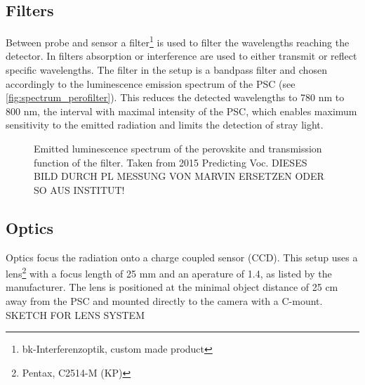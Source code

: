 \subsection{Filters}
Between probe and sensor a filter\footnote{bk-Interferenzoptik, custom made product} is used to filter the wavelengths reaching the detector. In filters absorption or interference are used to either transmit or reflect specific wavelengths. The filter in the setup is a bandpass filter and chosen accordingly to the luminescence emission spectrum of the PSC (see \autoref{fig:spectrum_perofilter}). This reduces the detected wavelengths to 780 nm to 800 nm, the interval with maximal intensity of the PSC, which enables maximum sensitivity to the emitted radiation and limits the detection of stray light. %

\begin{figure}[h]
	\centering
	
	\caption{Emitted luminescence spectrum of the perovskite and transmission function of the filter. Taken from 2015 Predicting Voc. DIESES BILD DURCH PL MESSUNG VON MARVIN ERSETZEN ODER SO AUS INSTITUT!}
	\label{fig:spectrum_perofilter}
\end{figure}
\subsection{Optics}
Optics focus the radiation onto a charge coupled sensor (CCD). This setup uses a lens\footnote{Pentax, C2514-M (KP)} with a focus length of 25 mm and an aperature of 1.4, as listed by the manufacturer. The lens is positioned at the minimal object distance of  25 cm away from the PSC and mounted directly to the camera with a C-mount.
\\
SKETCH FOR LENS SYSTEM
\\


